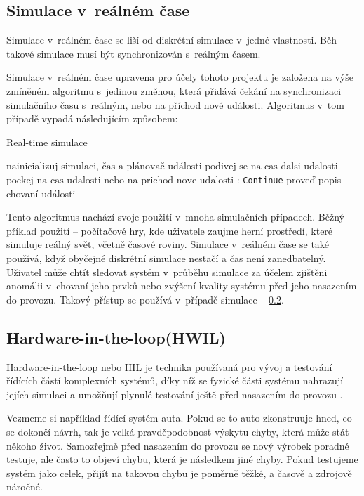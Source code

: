 \subsection{Simulace v~reálném čase}
\label{subsec:real-time-sim}
Simulace v~reálném čase se liší od diskrétní simulace v~jedné vlastnosti. Běh takové simulace musí být synchronizován s~reálným časem.

Simulace v~reálném čase upravena pro účely tohoto projektu je založena na výše zmíněném algoritmu  s~jedinou změnou, která přidává čekání na synchronizaci simulačního času s~reálným, nebo na příchod nové události. Algoritmus v~tom případě vypadá následujícím způsobem:

\begin{algorithm}
\caption{Real-time simulace}\label{real-time-alg}
\begin{algorithmic}[1]
\State $\text{nainicializuj simulaci, čas a plánovač události}$
\State $\text{podivej se na cas dalsi udalosti}$
\Return
\EndIf
\State $\text{pockej na cas udalosti nebo na prichod nove udalosti}$
:
   \State \texttt{Continue}
\EndIf
\State proveď popis chovaní události
\EndWhile
\end{algorithmic}
\end{algorithm}

Tento algoritmus nachází svoje použití v~mnoha simulačních případech. Běžný příklad použití -- počítačové hry, kde uživatele zaujme herní prostředí, které simuluje reálný svět, včetně časové roviny. Simulace v~reálném čase se také používá, když obyčejné diskrétní simulace nestačí a čas není zanedbatelný. Uživatel může chtít sledovat systém v~průběhu simulace za účelem zjištěni anomálii v~chovaní jeho prvků nebo zvýšení kvality systému před jeho nasazením do provozu. Takový přístup se používá v~případě simulace  -- \ref{subsec:hwil}.

\subsection{Hardware-in-the-loop(HWIL)}
\label{subsec:hwil}

Hardware-in-the-loop nebo HIL je technika používaná pro vývoj a testování řídících částí komplexních systémů, díky níž se fyzické části systému nahrazují jejích simulaci a umožňují plynulé testování ještě před nasazením do provozu \cite{hil}.

Vezmeme si například řídící systém auta. Pokud se to auto zkonstruuje hned, co se dokončí návrh, tak je velká pravděpodobnost výskytu chyby, která může stát někoho život. Samozřejmě před nasazením do provozu se nový výrobek poradně testuje, ale často to objeví chybu, která je následkem jiné chyby. Pokud testujeme systém jako celek, přijít na takovou chybu je poměrně těžké, a časově a zdrojově náročné.

